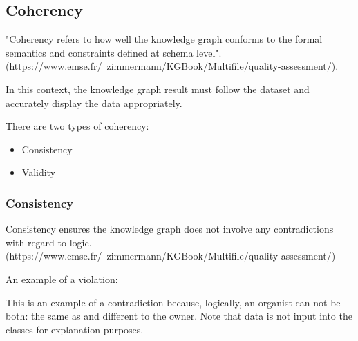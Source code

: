\subsection{Coherency}
\hspace{0.5cm} "Coherency refers to how well the knowledge graph conforms to the formal semantics and constraints defined at schema level". \\  (https://www.emse.fr/~zimmermann/KGBook/Multifile/quality-assessment/). 

In this context, the knowledge graph result must follow the dataset and accurately display the data appropriately. 

There are two types of coherency:
\begin{itemize}
\item Consistency
\item Validity
\end{itemize}

\subsubsection{Consistency}
\hspace{0.5cm} Consistency ensures the knowledge graph does not involve any contradictions with regard to logic.  \\
(https://www.emse.fr/~zimmermann/KGBook/Multifile/quality-assessment/) 

An example of a violation: 
\begin{center}
\end{center}

\begin{center}
\end{center}

This is an example of a contradiction because, logically, an organist can not be both: the same as and different to the owner. Note that data is not input into the classes for explanation purposes.


